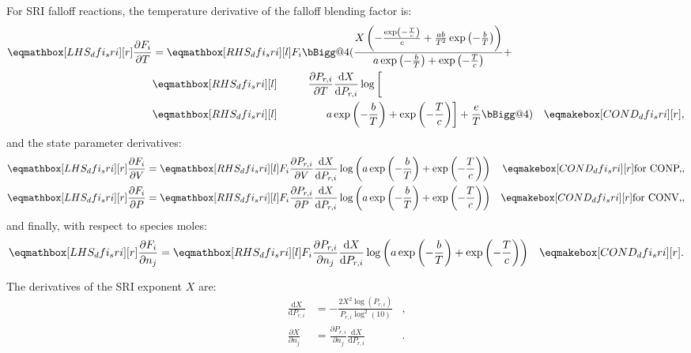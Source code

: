 \documentclass[12pt,number,sort&compress]{elsarticle}
\makeatletter
\newcommand{\vast}{\bBigg@{4}}
\makeatother
\begin{document}
For SRI falloff reactions, the temperature derivative of the falloff blending factor is:
\begin{align}
 \lhs{dfi_sri}{\frac{\partial F_{i} }{\partial T }} &= \rhs{dfi_sri}{F_{i} \vast(\frac{X \left(- \frac{\operatorname{exp}\left({- \frac{T}{c}}\right)}{c} + \frac{a b}{T^{2}} \operatorname{exp}\left({- \frac{b}{T}}\right)\right)}{a \operatorname{exp}\left({- \frac{b}{T}}\right) + \operatorname{exp}\left({- \frac{T}{c}}\right)} + } & \nonumber \\
 & \rhs{dfi_sri}{\mathindent[extras] \frac{\partial P_{r, i} }{\partial T } \frac{\text{d} X }{\text{d} P_{r, i} } \log{\biggl[}} & \nonumber \\
 & \rhs{dfi_sri}{\mathindent[largerstill] a \operatorname{exp}\left({- \frac{b}{T}}\right) + \operatorname{exp}\left({- \frac{T}{c}}\right) \biggr] + \frac{e}{T} \vast)} & \cond{dfi_sri}{,} \label{e:dfi_sri_dt}
\end{align}
and the state parameter derivatives:
\begin{subequations}
 \label{e:dfi_sri_de}
 \begin{align}
 \lhs{dfi_sri}{\frac{\partial F_{i} }{\partial V }} &= \rhs{dfi_sri}{F_{i} \frac{\partial P_{r, i} }{\partial V } \frac{\text{d} X }{\text{d} P_{r, i} } \log{\left (a \operatorname{exp}\left({- \frac{b}{T}}\right) + \operatorname{exp}\left({- \frac{T}{c}}\right) \right )}} & \cond{dfi_sri}{\dconp/,} \\
 \lhs{dfi_sri}{\frac{\partial F_{i} }{\partial P }} &= \rhs{dfi_sri}{F_{i} \frac{\partial P_{r, i} }{\partial P } \frac{\text{d} X }{\text{d} P_{r, i} } \log{\left (a \operatorname{exp}\left({- \frac{b}{T}}\right) + \operatorname{exp}\left({- \frac{T}{c}}\right) \right )}} & \cond{dfi_sri}{\dconv/,}
 \end{align}
\end{subequations}
and finally, with respect to species moles:
\begin{align}
 \lhs{dfi_sri}{\frac{\partial F_{i} }{\partial {n_j} }} &= \rhs{dfi_sri}{F_{i} \frac{\partial P_{r, i} }{\partial {n_j} } \frac{\text{d} X }{\text{d} P_{r, i} } \log{\left (a \operatorname{exp}\left({- \frac{b}{T}}\right) + \operatorname{exp}\left({- \frac{T}{c}}\right) \right )}} & \cond{dfi_sri}{.} \label{e:dfi_sri_dnj}
\end{align}

The derivatives of the SRI exponent $X$ are:
\begin{align}
 \frac{\text{d} X }{\text{d} P_{r, i} } &= - \frac{2 X^{2} \log{\left (P_{r, i} \right )}}{P_{r, i} \log^{2}{\left (10 \right )}} &, \\
 \frac{\partial X}{\partial n_j} &= \frac{\partial P_{r, i} }{\partial {n_j} } \frac{\text{d} X }{\text{d} P_{r, i} } &.
\end{align}
\end{document}
